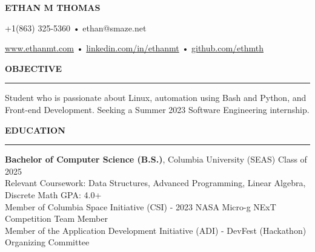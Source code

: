 \documentclass[10pt,letterpaper]{article}
\begin{document}
\begingroup
    \centerline{\MakeUppercase{\LARGE\bf Ethan M Thomas}}
    \medskip
\endgroup

\begingroup
\centerline{+1(863) 325-5360 • ethan@smaze.net}
\endgroup
\par

\begingroup
\centerline{\href{www.ethanmt.com}{www.ethanmt.com} • \href{https://www.linkedin.com/in/ethanmt/}{linkedin.com/in/ethanmt} • \href{https://github.com/ethmth}{github.com/ethmth}}
\endgroup
\par


\medskip
\MakeUppercase{{\bf Objective}} %
\medskip
\hrule %
\begin{list}{}{\setlength{\leftmargin}{0em}}
\item 
    {Student who is passionate about
    Linux, automation using Bash and Python, and Front-end Development. Seeking a Summer 2023 Software Engineering internship.}
\end{list}


\medskip
\MakeUppercase{{\bf Education}} %
\medskip
\hrule %
\begin{list}{}{\setlength{\leftmargin}{0em}}
\item 
{\bf Bachelor of Computer Science (B.S.)}, Columbia University (SEAS) \hfill  {Class of 2025}\\
Relevant Coursework: Data Structures, Advanced Programming, Linear Algebra, Discrete Math \hfill {GPA: 4.0+}
\medskip
\\
Member of Columbia Space Initiative (CSI) - 2023 NASA Micro-g NExT Competition Team Member \\ 
Member of the Application Development Initiative (ADI) - DevFest (Hackathon) Organizing Committee
\end{list}


\end{document}
